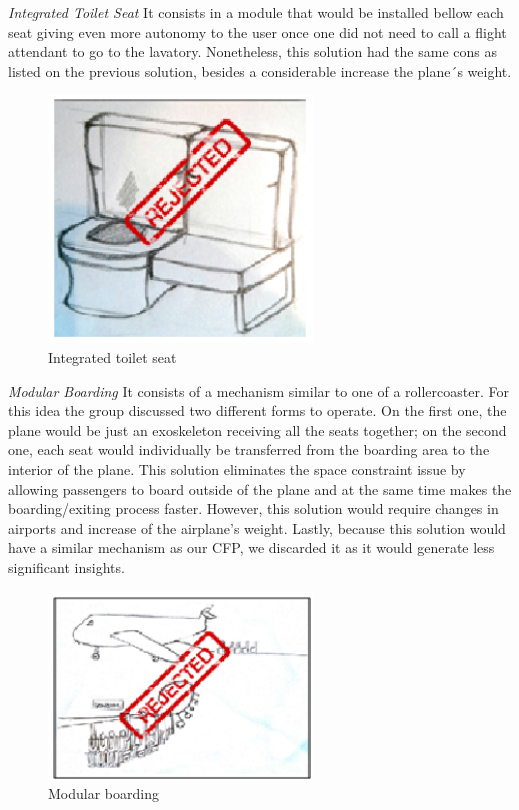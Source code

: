 \emph{Integrated Toilet Seat} It consists in a module that would be installed bellow each seat giving even more autonomy to the user once one did not need to call a flight attendant to go to 
the lavatory. Nonetheless, this solution had the same cons as listed on the previous solution, besides a considerable increase the plane´s weight.

\begin{figure}[h]
\centering
\includegraphics[width=7cm]{brazil_images/image006.png}
\caption{Integrated toilet seat}
\label{fig:integrated_toilet}
\end{figure}

\emph{Modular Boarding} It consists of a mechanism similar to one of a rollercoaster. For this idea the group discussed two different forms to operate. On the first one, the plane would be just an exoskeleton receiving all the seats together; on the second one, each seat would individually be transferred from the boarding area to the interior of the plane. This solution eliminates the space constraint issue by allowing passengers to board outside of the plane and at the same time makes the boarding/exiting process faster. However, this solution would require changes in airports and increase of the airplane’s weight. Lastly, because this solution would have a similar mechanism as our CFP, we discarded it as it would generate less significant insights.

\begin{figure}[h]
\centering
\includegraphics[width=7cm]{brazil_images/image007.png}
\caption{Modular boarding}
\label{fig:modular_boarding}
\end{figure}

